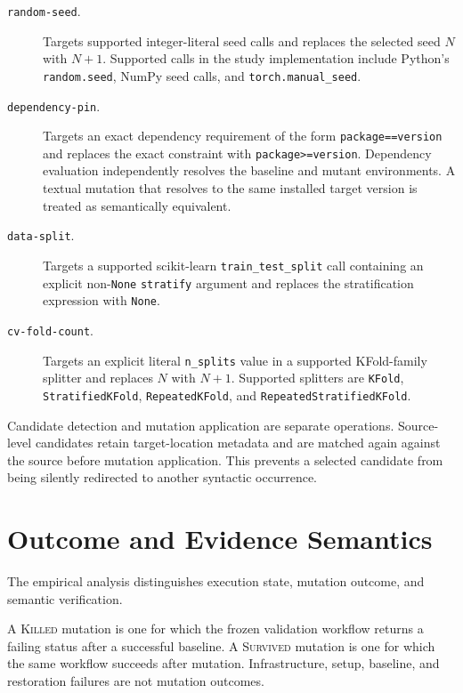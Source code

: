 \begin{description}

\item[\texttt{random-seed}.]
Targets supported integer-literal seed calls and replaces the selected seed
\(N\) with \(N+1\). Supported calls in the study implementation include
Python's \texttt{random.seed}, NumPy seed calls, and
\texttt{torch.manual\_seed}.

\item[\texttt{dependency-pin}.]
Targets an exact dependency requirement of the form
\texttt{package==version} and replaces the exact constraint with
\texttt{package>=version}. Dependency evaluation independently resolves the
baseline and mutant environments. A textual mutation that resolves to the same
installed target version is treated as semantically equivalent.

\item[\texttt{data-split}.]
Targets a supported scikit-learn \texttt{train\_test\_split} call containing an
explicit non-\texttt{None} \texttt{stratify} argument and replaces the
stratification expression with \texttt{None}.

\item[\texttt{cv-fold-count}.]
Targets an explicit literal \texttt{n\_splits} value in a supported
KFold-family splitter and replaces \(N\) with \(N+1\). Supported splitters are
\texttt{KFold}, \texttt{StratifiedKFold}, \texttt{RepeatedKFold}, and
\texttt{RepeatedStratifiedKFold}.

\end{description}

Candidate detection and mutation application are separate operations.
Source-level candidates retain target-location metadata and are matched again
against the source before mutation application. This prevents a selected
candidate from being silently redirected to another syntactic occurrence.


\section{Outcome and Evidence Semantics}
\label{app:outcome-semantics}

The empirical analysis distinguishes execution state, mutation outcome, and
semantic verification.

A \textsc{Killed} mutation is one for which the frozen validation workflow
returns a failing status after a successful baseline. A \textsc{Survived}
mutation is one for which the same workflow succeeds after mutation.
Infrastructure, setup, baseline, and restoration failures are not mutation
outcomes.

